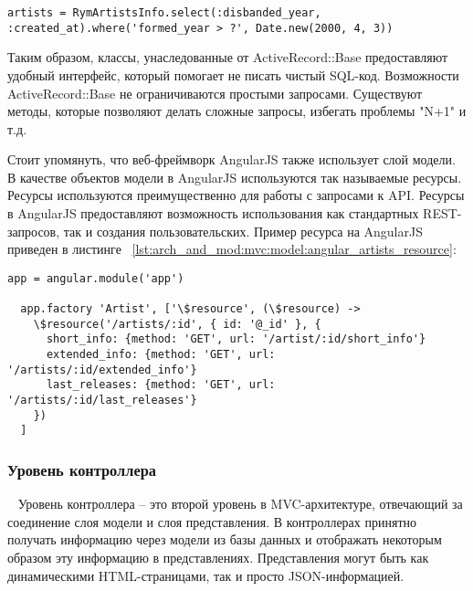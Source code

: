 \begin{lstlisting}[style=fsharpstyle,caption={Пример получения артистов по определенным параметрам}, label=lst:arch_and_mod:mvc:model:select_artist_where_year]
  artists = RymArtistsInfo.select(:disbanded_year, :created_at).where('formed_year > ?', Date.new(2000, 4, 3))
\end{lstlisting}

Таким образом, классы, унаследованные от ActiveRecord::Base предоставляют удобный интерфейс, который помогает не писать чистый SQL-код. Возможности ActiveRecord::Base не ограничиваются простыми запросами. Существуют методы, которые позволяют делать сложные запросы, избегать проблемы "N+1" и т.д.

Стоит упомянуть, что веб-фреймворк AngularJS также использует слой модели. В качестве объектов модели в AngularJS используются так называемые ресурсы. Ресурсы используются преимущественно для работы с запросами к API. Ресурсы в AngularJS предоставляют возможность использования как стандартных REST-запросов, так и создания пользовательских. Пример ресурса на AngularJS приведен в листинге ~\ref{lst:arch_and_mod:mvc:model:angular_artists_resource}:

\begin{lstlisting}[style=fsharpstyle,caption={Пример получения артистов по определенным параметрам}, label=lst:arch_and_mod:mvc:model:angular_artists_resource]
  app = angular.module('app')

  app.factory 'Artist', ['\$resource', (\$resource) ->
    \$resource('/artists/:id', { id: '@_id' }, {
      short_info: {method: 'GET', url: '/artist/:id/short_info'}
      extended_info: {method: 'GET', url: '/artists/:id/extended_info'}
      last_releases: {method: 'GET', url: '/artists/:id/last_releases'}
    })
  ]
\end{lstlisting}

\subsubsection{Уровень контроллера}
\label{sub:arch_and_mod:mvc:controller}
~\newline
\indent Уровень контроллера -- это второй уровень в MVC-архитектуре, отвечающий за соединение слоя модели и слоя представления. В контроллерах принятно получать информацию через модели из базы данных и отображать некоторым образом эту информацию в представлениях. Представления могут быть как динамическими HTML-страницами, так и просто JSON-информацией.

